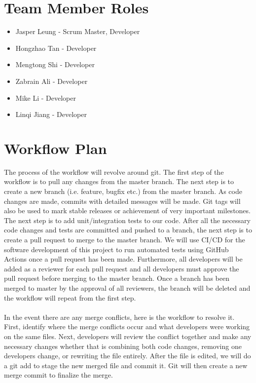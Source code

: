 \documentclass{article}
\begin{document}
\section{Team Member Roles}
\begin{itemize}
    \item Jasper Leung - Scrum Master, Developer
    \item Hongzhao Tan - Developer
    \item Mengtong Shi - Developer
    \item Zabrain Ali - Developer
    \item Mike Li - Developer
    \item Linqi Jiang - Developer
\end{itemize}

\section{Workflow Plan}
	
	The process of the workflow will revolve around git. The first step of the workflow is to pull any changes from the master branch. The next step is to create a new branch (i.e. feature, bugfix etc.) from the master branch. As code changes are made, commits with detailed messages will be made. Git tags will also be used to mark stable releases or achievement of very important milestones. The next step is to add unit/integration tests to our code. After all the necessary code changes and tests are committed and pushed to a branch, the next step is to create a pull request to merge to the master branch. We will use CI/CD for the software development of this project to run automated tests using GitHub Actions once a pull request has been made. Furthermore, all developers will be added as a reviewer for each pull request and all developers must approve the pull request before merging to the master branch. Once a branch has been merged to master by the approval of all reviewers, the branch will be deleted and the workflow will repeat from the first step. 
	\\
	\\
	In the event there are any merge conflicts, here is the workflow to resolve it. First, identify where the merge conflicts occur and what developers were working on the same files. Next, developers will review the conflict together and make any necessary changes whether that is combining both code changes, removing one developers change, or rewriting the file entirely. After the file is edited, we will do a git add to stage the new merged file and commit it. Git will then create a new merge commit to finalize the merge.
\end{document}
